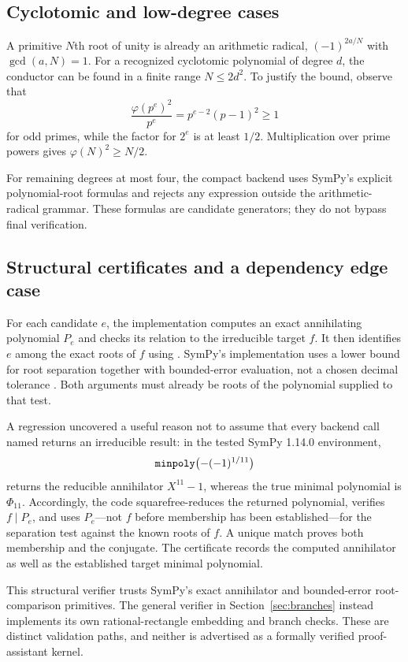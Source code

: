 \documentclass[11pt,letterpaper]{article}
\theoremstyle{definition}\newtheorem{definition}[theorem]{Definition}
\theoremstyle{remark}\newtheorem{remark}[theorem]{Remark}
\newcommand{\code}[1]{\texttt{\detokenize{#1}}}
\begin{document}
\subsection{Cyclotomic and low-degree cases}
A primitive $N$th root of unity is already an arithmetic radical, $(-1)^{2a/N}$ with $\gcd(a,N)=1$. For a recognized cyclotomic polynomial of degree $d$, the conductor can be found in a finite range $N\leq2d^2$. To justify the bound, observe that
\[
 \frac{\varphi(p^e)^2}{p^e}=p^{e-2}(p-1)^2\geq1
\]
for odd primes, while the factor for $2^e$ is at least $1/2$. Multiplication over prime powers gives $\varphi(N)^2\geq N/2$.

For remaining degrees at most four, the compact backend uses SymPy's explicit polynomial-root formulas and rejects any expression outside the arithmetic-radical grammar. These formulas are candidate generators; they do not bypass final verification.

\subsection{Structural certificates and a dependency edge case}
For each candidate $e$, the implementation computes an exact annihilating polynomial $P_e$ and checks its relation to the irreducible target $f$. It then identifies $e$ among the exact roots of $f$ using \code{Poly.same_root}. SymPy's implementation uses a lower bound for root separation together with bounded-error evaluation, not a chosen decimal tolerance \cite{sympypolys}. Both arguments must already be roots of the polynomial supplied to that test.

A regression uncovered a useful reason not to assume that every backend call named \code{minpoly} returns an irreducible result: in the tested SymPy 1.14.0 environment,
\[
 \code{minpoly}\bigl(-(-1)^{1/11}\bigr)
\]
returns the reducible annihilator $X^{11}-1$, whereas the true minimal polynomial is $\Phi_{11}$. Accordingly, the code squarefree-reduces the returned polynomial, verifies $f\mid P_e$, and uses $P_e$---not $f$ before membership has been established---for the separation test against the known roots of $f$. A unique match proves both membership and the conjugate. The certificate records the computed annihilator as well as the established target minimal polynomial.

This structural verifier trusts SymPy's exact annihilator and bounded-error root-comparison primitives. The general verifier in Section~\ref{sec:branches} instead implements its own rational-rectangle embedding and branch checks. These are distinct validation paths, and neither is advertised as a formally verified proof-assistant kernel.
\end{document}
